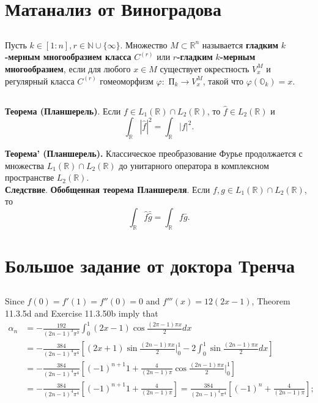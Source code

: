 \documentclass{article}
\begin{document}
	\pagestyle{empty}
	\normalsize
	\section{Матанализ от Виноградова}
	\subsection{}
	Пусть $k \in [1:n], r \in \mathbb{N} \cup \{\infty\}$. Множество $M \subset \mathbb{R}^n$ называется \textbf{гладким} $k$\textbf{-мерным многообразием класса} $C^{(r)}$ или $r$\textbf{-гладким} $k$\textbf{-мерным многообразием}, если для любого $x \in M$ существует окрестность $V_{x}^{M}$ и регулярный класса $C^{(r)}$ гомеоморфизм $\varphi : $ П$_{k} \rightarrow V_{x}^{M}$, такой что $\varphi(\mathbb{O}_{k})=x$.
	\subsection{}
	\textbf{Теорема (Планшерель)}. Если $f \in L_{1}(\mathbb{R}) \cap L_{2}(\mathbb{R})$, то $\widehat{f} \in L_{2}(\mathbb{R})$ и
	\[\int_{\mathbb{R}}|\widehat{f}|^{2}=\int_{\mathbb{R}}|f|^{2}.\]

	\textbf{Теорема' (Планшерель).} Классическое преобразование Фурье продолжается с множества $L_{1}(\mathbb{R}) \cap L_{2}(\mathbb{R})$ до унитарного оператора в комплексном пространстве $L_{2}(\mathbb{R})$. \\
	\textbf{Следствие}. \textbf{Обобщенная теорема Планшереля}. Если $f, g \in L_{1}(\mathbb{R}) \cap L_{2}(\mathbb{R})$, то
	\[\int_{\mathbb{R}}\widehat{f}\bar{\widehat{g}} = \int_{\mathbb{R}}f\bar{g}.\]

	\section{Большое задание от доктора Тренча}
	\subsection{}
	Since $f(0)=f'(1)=f''(0)=0$ and $f'''(x)=12(2x-1)$, Theorem 11.3.5d and Exercise 11.3.50b imply that
	\begin{align*}
		\alpha_{n} &= -\frac{192}{(2n-1)^{3}\pi^{3}}\int_{0}^{1}(2x-1)\cos{\frac{(2\pi-1)\pi x}{2}}dx \\
		&= -\frac{384}{(2n-1)^{4}\pi^{4}}\left[(2x+1)\sin{\frac{(2n-1)\pi x}{2}}\bigg|_{0}^{1}-2\int_{0}^{1}\sin{\frac{(2n-1)\pi x}{2}}dx\right] \\
		&= -\frac{384}{(2n-1)^{4}\pi^{4}}\left[(-1)^{n+1}1+\frac{4}{(2n-1)\pi}\cos{\frac{(2n-1)\pi x}{2}}\bigg|_{0}^{1}\right] \\
		&= -\frac{384}{(2n-1)^{4}\pi^{4}}\left[(-1)^{n+1}1+\frac{4}{(2n-1)\pi}\right] = \frac{384}{(2n-1)^{4}\pi^{4}}\left[(-1)^{n}+\frac{4}{(2n-1)\pi}\right];
	\end{align*}
\end{document}
